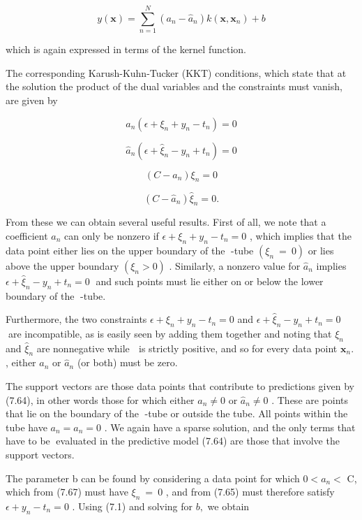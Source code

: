 \documentclass[
  10
]{article}
\begin{document}
\[
y (\mathbf {x}) = \sum_ {n = 1} ^ {N} (a _ {n} - \widehat {a} _ {n}) k (\mathbf {x}, \mathbf {x} _ {n}) + b\tag{7.64}
\]

which is again expressed in terms of the kernel function.

The corresponding Karush-Kuhn-Tucker (KKT) conditions, which state that
at the solution the product of the dual variables and the constraints
must vanish, are given by

\[
a _ {n} (\epsilon + \xi_ {n} + y _ {n} - t _ {n}) = 0\tag{7.65}
\]

\[
\widehat {a} _ {n} (\epsilon + \widehat {\xi} _ {n} - y _ {n} + t _ {n}) = 0\tag{7.66}
\]

\[
(C - a _ {n}) \xi_ {n} = 0\tag{7.67}
\]

\[
(C - \widehat {a} _ {n}) \widehat {\xi} _ {n} = 0.\tag{7.68}
\]

From these we can obtain several useful results. First of all, we note
that a coefficient \(a _ { n }\) can only be nonzero if
\(\epsilon + \xi _ { n } + y _ { n } - t _ { n } = 0\) , which implies
that the data point either lies on the upper boundary of the -tube
\(( \xi _ { n } ~ = ~ 0 )\) or lies above the upper boundary
\(( \xi _ { n } > 0 )\) . Similarly, a nonzero value for
\(\widehat { a } _ { n }\) implies
\(\epsilon + \widehat { \xi } _ { n } - y _ { n } + t _ { n } = 0\) and
such points must lie either on or below the lower boundary of the -tube.

Furthermore, the two constraints
\(\epsilon + \xi _ { n } + y _ { n } - t _ { n } = 0\) and
\(\epsilon + \widehat { \xi } _ { n } - y _ { n } + t _ { n } = 0\) are
incompatible, as is easily seen by adding them together and noting that
\(\xi _ { n }\) and \(\widehat { \xi } _ { n }\) are nonnegative while 
is strictly positive, and so for every data point
\(\mathbf { x } _ { n } .\) , either \(a _ { n }\) or
\(\widehat { a } _ { n }\) (or both) must be zero.

The support vectors are those data points that contribute to predictions
given by (7.64), in other words those for which either
\(a _ { n } \neq 0\) or \(\widehat { a } _ { n } \neq 0\) . These are
points that lie on the boundary of the -tube or outside the tube. All
points within the tube have
\(a _ { n } = { \widehat { a } } _ { n } = 0\) . We again have a sparse
solution, and the only terms that have to be evaluated in the predictive
model (7.64) are those that involve the support vectors.

The parameter b can be found by considering a data point for which
\(0 < a _ { n } <\) C, which from (7.67) must have
\(\xi _ { n } ~ = ~ 0\) , and from (7.65) must therefore satisfy
\(\epsilon + y _ { n } - t _ { n } = 0\) . Using (7.1) and solving for
\(b ,\) we obtain
\end{document}
